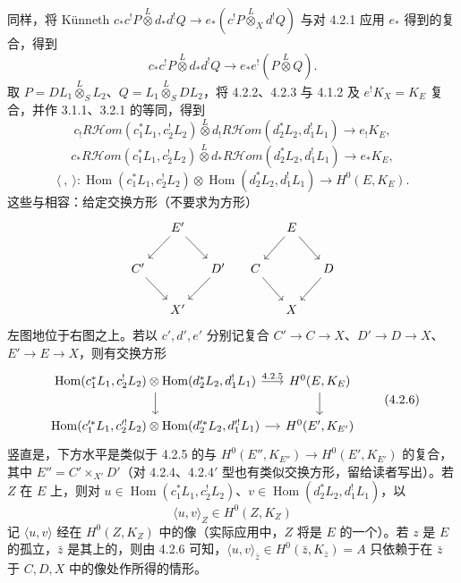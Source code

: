 同样，将 Künneth  $c_*c^!P\mathbin{\overset L\otimes}d_*d^!Q\to e_*(c^!P\mathbin{\overset L\otimes}_Xd^!Q)$ 与对 4.2.1 应用 $e_*$ 得到的复合，得到
\[c_*c^!P\mathbin{\overset L\otimes}d_*d^!Q\longrightarrow e_*e^!(P\mathbin{\overset L\otimes}Q).\tag{4.2.3}\]
取 $P=DL_1\mathbin{\overset L\otimes}_SL_2$、$Q=L_1\mathbin{\overset L\otimes}_SDL_2$，将 4.2.2、4.2.3 与 4.1.2 及 $e^!K_X=K_E$ 复合，并作 3.1.1、3.2.1 的等同，得到
\[c_!R\mathcal Hom(c_1^*L_1,c_2^!L_2)\mathbin{\overset L\otimes}d_!R\mathcal Hom(d_2^*L_2,d_1^!L_1)\longrightarrow e_!K_E,\tag{4.2.4}\]
\[c_*R\mathcal Hom(c_1^*L_1,c_2^!L_2)\mathbin{\overset L\otimes}d_*R\mathcal Hom(d_2^*L_2,d_1^!L_1)\longrightarrow e_*K_E,\tag{4.2.4$'$}\]
\[\langle\ ,\ \rangle:\operatorname{Hom}(c_1^*L_1,c_2^!L_2)\otimes\operatorname{Hom}(d_2^*L_2,d_1^!L_1)\longrightarrow H^0(E,K_E).\tag{4.2.5}\]
这些与相容：给定交换方形（不要求为方形）
\[\begin{tikzcd}[column sep=small] &E'\arrow[dl]\arrow[dr]&&&E\arrow[dl]\arrow[dr]&\\ C'\arrow[dr]&&D'\arrow[dl]&C\arrow[dr]&&D\arrow[dl]\\ &X'&&&X&\end{tikzcd}\]
左图地位于右图之上。若以 $c',d',e'$ 分别记复合 $C'\to C\to X$、$D'\to D\to X$、$E'\to E\to X$，则有交换方形
\[\begin{tikzcd}[column sep=small]
\operatorname{Hom}(c_1^*L_1,c_2^!L_2)\otimes\operatorname{Hom}(d_2^*L_2,d_1^!L_1)\arrow[r,"4.2.5"]\arrow[d]&H^0(E,K_E)\arrow[d]\\
\operatorname{Hom}(c_1'^*L_1,c_2'^!L_2)\otimes\operatorname{Hom}(d_2'^*L_2,d_1'^!L_1)\arrow[r]&H^0(E',K_{E'})
\end{tikzcd}\tag{4.2.6}\]
竖直是，下方水平是类似于 4.2.5 的与 $H^0(E'',K_{E''})\to H^0(E',K_{E'})$ 的复合，其中 $E''=C'\times_{X'}D'$（对 4.2.4、4.2.4$'$ 型也有类似交换方形，留给读者写出）。若 $Z$ 在 $E$ 上，则对 $u\in\operatorname{Hom}(c_1^*L_1,c_2^!L_2)$、$v\in\operatorname{Hom}(d_2^*L_2,d_1^!L_1)$，以
\[\langle u,v\rangle_Z\in H^0(Z,K_Z)\tag{4.2.7}\]
记 $\langle u,v\rangle$ 经在 $H^0(Z,K_Z)$ 中的像（实际应用中，$Z$ 将是 $E$ 的一个）。若 $z$ 是 $E$ 的孤立，$\bar z$ 是其上的，则由 4.2.6 可知，$\langle u,v\rangle_{\bar z}\in H^0(\bar z,K_{\bar z})=A$ 只依赖于在 $\bar z$ 于 $C,D,X$ 中的像处作所得的情形。
